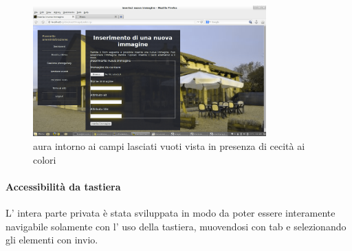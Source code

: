 	\begin{figure}[H]
		\centering \includegraphics[width=0.8\textwidth]{images/color4.png}
		\caption{aura intorno ai campi lasciati vuoti vista in presenza di cecità ai colori}
	\end{figure}
\paragraph{Accessibilità da tastiera}
L' intera parte privata è stata sviluppata in modo da poter essere interamente navigabile solamente con l' uso della tastiera, muovendosi con tab e selezionando gli elementi con invio.
